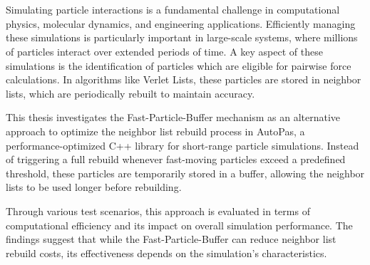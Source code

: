 \chapter{\abstractname}

Simulating particle interactions is a fundamental challenge in computational physics, molecular dynamics, and engineering applications. Efficiently managing these simulations is particularly important in large-scale systems, where millions of particles interact over extended periods of time. A key aspect of these simulations is the identification of particles which are eligible for pairwise force calculations. In algorithms like Verlet Lists, these particles are stored in neighbor lists, which are periodically rebuilt to maintain accuracy.

This thesis investigates the Fast-Particle-Buffer mechanism as an alternative approach to optimize the neighbor list rebuild process in AutoPas, a performance-optimized C++ library for short-range particle simulations. Instead of triggering a full rebuild whenever fast-moving particles exceed a predefined threshold, these particles are temporarily stored in a buffer, allowing the neighbor lists to be used longer before rebuilding. 

Through various test scenarios, this approach is evaluated in terms of computational efficiency and its impact on overall simulation performance. The findings suggest that while the Fast-Particle-Buffer can reduce neighbor list rebuild costs, its effectiveness depends on the simulation's characteristics. 

